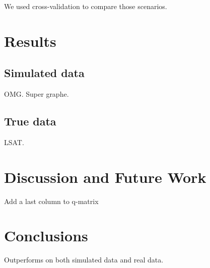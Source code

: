 \documentclass{sig-alternate}
\begin{document}
We used cross-validation to compare those scenarios.

\section{Results}

\subsection{Simulated data}

OMG. Super graphe.

\subsection{True data}

LSAT.

\section{Discussion and Future Work}

Add a last column to q-matrix

\section{Conclusions}

Outperforms on both simulated data and real data.

%


%
%

\end{document}

